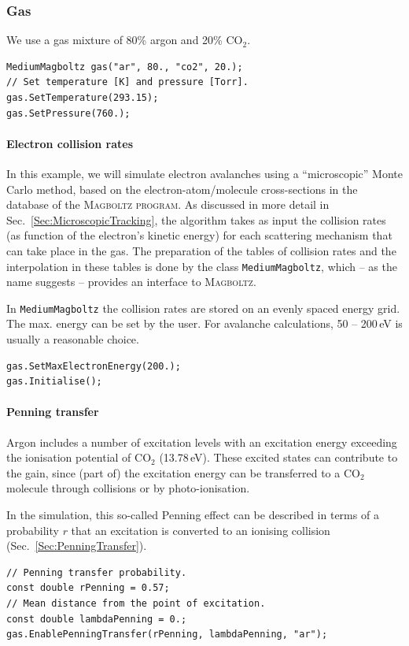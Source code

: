 \subsubsection{Gas}
We use a gas mixture of 80\% argon and 20\% CO\(_{2}\).
\begin{lstlisting}
MediumMagboltz gas("ar", 80., "co2", 20.);
// Set temperature [K] and pressure [Torr].
gas.SetTemperature(293.15);
gas.SetPressure(760.);
\end{lstlisting}
\paragraph{Electron collision rates}
In this example, we will simulate electron avalanches using 
a ``microscopic'' Monte Carlo method,
based on the electron-atom/molecule cross-sections in the database of the 
\textsc{Magboltz program}. 
As discussed in more detail in Sec.~\ref{Sec:MicroscopicTracking},
the algorithm takes as input the collision rates (as function of the 
electron's kinetic energy) for each scattering mechanism 
that can take place in the gas.
The preparation of the tables of collision rates and the interpolation 
in these tables is done by the class \texttt{MediumMagboltz}, which -- as
the name suggests -- provides an interface to \textsc{Magboltz}.

In \texttt{MediumMagboltz} the collision rates are stored on an
evenly spaced energy grid. The max. energy can be set by the user.
For avalanche calculations, 50 -- 200\,eV is usually a reasonable choice.
\begin{lstlisting}
gas.SetMaxElectronEnergy(200.);
gas.Initialise();
\end{lstlisting}
\paragraph{Penning transfer}
Argon includes a number of excitation levels with an excitation energy
exceeding the ionisation potential of CO$_{2}$ (13.78\,eV).
These excited states can contribute to the gain,
since (part of) the excitation energy can be transferred
to a CO$_2$ molecule through collisions or by photo-ionisation.

In the simulation, this so-called Penning effect can be described 
in terms of a probability $r$ that an excitation is converted to an 
ionising collision (Sec.~\ref{Sec:PenningTransfer}).
\begin{lstlisting}
// Penning transfer probability.
const double rPenning = 0.57;
// Mean distance from the point of excitation.
const double lambdaPenning = 0.;
gas.EnablePenningTransfer(rPenning, lambdaPenning, "ar");
\end{lstlisting}
